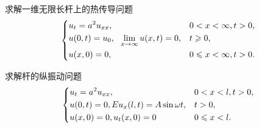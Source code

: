 \begin{yyEx}
	求解一维无限长杆上的热传导问题
	\begin{equation*}
	\begin{dcases}
	u_t = a^2u_{xx}, &0<x<\infty,t>0,\\
	u(0,t) = u_0,~~\lim\limits_{x\to\infty}u(x,t) = 0,&t \geqslant 0,\\
	u(x,0) = 0,&0\leqslant x<\infty,t>0.\\
	\end{dcases}
	\end{equation*}
\end{yyEx}

\begin{yyEx}
	求解杆的纵振动问题
	\begin{equation*}
	\begin{dcases}
	u_t = a^2u_{xx}, &0<x<l,t>0,\\
	u(0,t) = 0,Eu_x(l,t) = A\sin \omega t,&t > 0,\\
	u(x,0) = 0,u_t(x,0) = 0&0\leqslant x<l.\\
	\end{dcases}
	\end{equation*}
\end{yyEx}